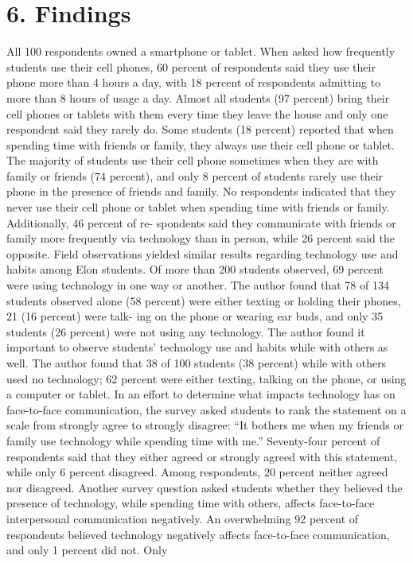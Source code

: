\documentclass[11pt]{article} %
\begin{document}
\section{6. Findings}
All 100 respondents owned a smartphone or tablet. When asked how frequently students use their 
cell phones, 60 percent of respondents said they use their phone more than 4 hours a day, with 18 percent of respondents 
admitting to more than 8 hours of usage a day. Almost all students (97 percent) bring their cell phones or tablets 
with them every time they leave the house and only one respondent said they rarely do. Some students 
(18 percent) reported that when spending time with friends or family, they always use their cell phone or tablet. The 
majority of students use their cell phone sometimes when they are with family or friends (74 percent), and only 8 percent 
of students rarely use their phone in the presence of friends and family. No respondents indicated that they 
never use their cell phone or tablet when spending time with friends or family. Additionally, 46 percent of re-
spondents said they communicate with friends or family more frequently via technology than in person, while 
26 percent said the opposite.  
Field observations yielded similar results regarding technology use and habits among Elon students. 
Of more than 200 students observed, 69 percent were using technology in one way or another. The author found 
that 78 of 134 students observed alone (58 percent) were either texting or holding their phones, 21 (16 percent) were talk-
ing on the phone or wearing ear buds, and only 35 students (26 percent) were not using any technology. 
The author found it important to observe students’ technology use and habits while with others as 
well. The author found that 38 of 100 students (38 percent) while with others used no technology; 62 percent were either 
texting, talking on the phone, or using a computer or tablet. 
In an effort to determine what impacts technology has on face-to-face communication, the survey 
asked students to rank the statement on a scale from strongly agree to strongly disagree: “It bothers me when 
my friends or family use technology while spending time with me.” Seventy-four percent of respondents said 
that they either agreed or strongly agreed with this statement, while only 6 percent disagreed. Among respondents, 
20 percent  neither agreed nor disagreed. 
Another survey question asked students whether they believed the presence of technology, while spending time with others, affects face-to-face interpersonal communication negatively. An overwhelming 92 percent of respondents believed technology negatively affects face-to-face communication, and only 1 percent did not. Only 
\end{document}
